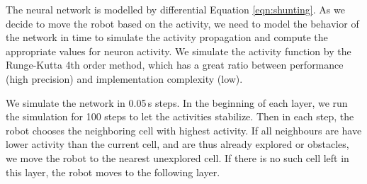 \documentclass[buriama8_dp.tex]{subfiles}
\begin{document}
The neural network is modelled by differential Equation \ref{eqn:shunting}. As we decide to move the robot based on the activity, we need to model the behavior of the network in time to simulate the activity propagation and compute the appropriate values for neuron activity. We simulate the activity function by the Runge-Kutta 4th order method, which has a great ratio between performance (high precision) and implementation complexity (low).

We simulate the network in 0.05\,s steps. In the beginning of each layer, we run the simulation for 100 steps to let the activities stabilize. Then in each step, the robot chooses the neighboring cell with highest activity. If all neighbours are have lower activity than the current cell, and are thus already explored or obstacles, we move the robot to the nearest unexplored cell. If there is no such cell left in this layer, the robot moves to the following layer.
\end{document}

